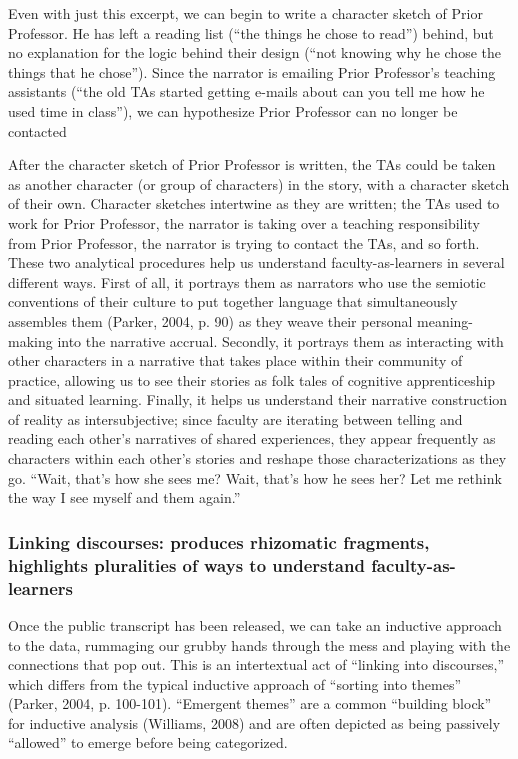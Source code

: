 Even with just this excerpt, we can begin to write a character sketch of Prior Professor. He has left a reading list (“the things he chose to read”) behind, but no explanation for the logic behind their design (“not knowing why he chose the things that he chose”). Since the narrator is emailing Prior Professor’s teaching assistants (“the old TAs started getting e-mails about can you tell me how he used time in class”), we can hypothesize Prior Professor can no longer be contacted

After the character sketch of Prior Professor is written, the TAs could be taken as another character (or group of characters) in the story, with a character sketch of their own. Character sketches intertwine as they are written; the TAs used to work for Prior Professor, the narrator is taking over a teaching responsibility from Prior Professor, the narrator is trying to contact the TAs, and so forth.
These two analytical procedures help us understand faculty-as-learners in several different ways. First of all, it portrays them as narrators who use the semiotic conventions of their culture to put together language that simultaneously assembles them (Parker, 2004, p. 90) as they weave their personal meaning-making into the narrative accrual. Secondly, it portrays them as interacting with other characters in a narrative that takes place within their community of practice, allowing us to see their stories as folk tales of cognitive apprenticeship and situated learning. Finally, it helps us understand their narrative construction of reality as intersubjective; since faculty are iterating between telling and reading each other’s narratives of shared experiences, they appear frequently as characters within each other’s stories and reshape those characterizations as they go. “Wait, that’s how she sees me? Wait, that’s how he sees her? Let me rethink the way I see myself and them again.”

\subsubsection{Linking discourses: produces rhizomatic fragments, highlights pluralities of ways to understand faculty-as-learners}

Once the public transcript has been released, we can take an inductive approach to the data, rummaging our grubby hands through the mess and playing with the connections that pop out. This is an intertextual act of “linking into discourses,” which differs from the typical inductive approach of “sorting into themes” (Parker, 2004, p. 100-101). “Emergent themes” are a common “building block” for inductive analysis (Williams, 2008) and are often depicted as being passively “allowed” to emerge before being categorized.


